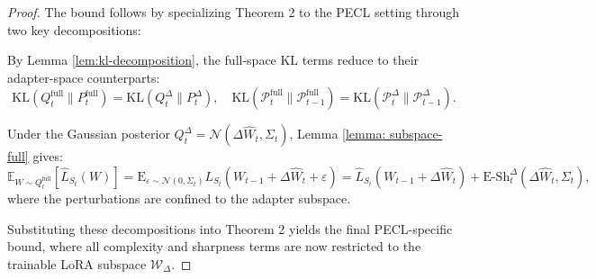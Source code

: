\documentclass[10pt]{article} %
\newtheorem{theorem}{Theorem}
\begin{document}


\begin{proof}
The bound follows by specializing Theorem 2 to the PECL setting through two key decompositions:

By Lemma \ref{lem:kl-decomposition}, the full-space KL terms reduce to their adapter-space counterparts:
\[
\mathrm{KL}(Q_t^{\mathrm{full}} \| P_t^{\mathrm{full}}) = \mathrm{KL}(Q_t^\Delta \| P_t^\Delta),
\quad
\mathrm{KL}(\mathcal{P}_t^{\mathrm{full}} \| \mathcal{P}_{t-1}^{\mathrm{full}}) = \mathrm{KL}(\mathcal{P}_t^\Delta \| \mathcal{P}_{t-1}^\Delta).
\]

Under the Gaussian posterior $Q_t^\Delta = \mathcal{N}(\Delta\hat{W}_t, \Sigma_t)$, Lemma \ref{lemma: subspace-full} gives:
\[
\mathbb{E}_{W \sim Q_t^{\mathrm{full}}}[\hat{L}_{S_t}(W)] 
= \mathrm{E}_{\varepsilon \sim \mathcal{N}(0, \Sigma_t)}{L}_{S_t}(W_{t-1}+\Delta\hat{W}_t + \varepsilon)
 = \hat{L}_{S_t}(W_{t-1} + \Delta\hat{W}_t) + \mathrm{E\text{-}Sh}_t^\Delta(\Delta\hat{W}_t, \Sigma_t),
\]
where the perturbations are confined to the adapter subspace.

Substituting these decompositions into Theorem 2 yields the final PECL-specific bound, where all complexity and sharpness terms are now restricted to the trainable LoRA subspace $\mathcal{W}_\Delta$.

\end{proof}
\end{document}
